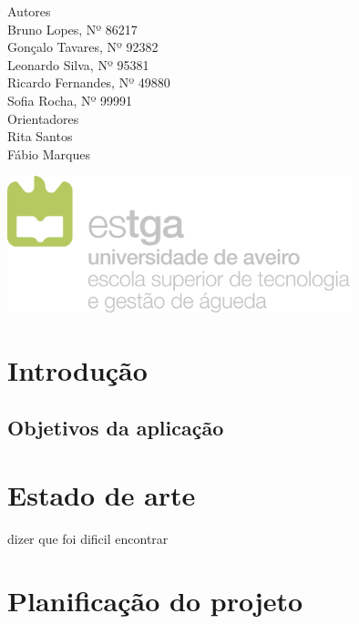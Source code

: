 \documentclass[11pt, twoside]{report}
\begin{document}
\begin{titlepage}
		
		
		\large
		Autores\\
		Bruno Lopes, Nº 86217 \\
		Gonçalo Tavares, Nº 92382  \\
		Leonardo Silva, Nº 95381 \\
		Ricardo Fernandes, Nº 49880  \\
		Sofia Rocha, Nº 99991 \\
		
		\vspace{1cm}
		Orientadores\\
		Rita Santos \\
		Fábio Marques\\
		\vspace{4cm}
		
		\centering
		\includegraphics[width=10cm]{image/AssB_vertical_cor}
		
	\end{titlepage}

	\newpage
	\setcounter{page}{1} %
	\tableofcontents %
	\thispagestyle{plain} %
	\thispagestyle{empty} %
	\newpage
	\listoftables %
	\newpage
	\listoffigures %
	
	\newpage
	
	\chapter{Introdução}
	\section{Objetivos da aplicação}
	
	
	\chapter{Estado de arte}
	dizer que foi dificil encontrar
	
	\chapter{Planificação do projeto}
\end{document}
